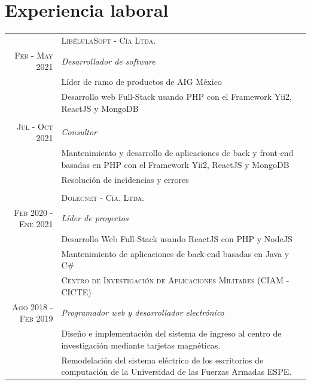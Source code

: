 \documentclass[a4paper,10.9pt]{article}
\begin{document}
\section{Experiencia laboral}
\begin{tabular}{r|p{11cm}}
&\textsc{LibélulaSoft - Cía Ltda.} \\
\textsc{Feb - May 2021} &\emph{Desarrollador de software}\\
&\footnotesize{Líder de ramo de productos de AIG México}\\
&\footnotesize{Desarrollo web Full-Stack usando PHP con el Framework Yii2, ReactJS y MongoDB}\\
\\
\textsc{Jul - Oct 2021} &\emph{Consultor}\\
&\footnotesize{Mantenimiento y desarrollo de aplicaciones de back y front-end basadas en PHP con el Framework Yii2, ReactJS y MongoDB}\\
&\footnotesize{Resolución de incidencias y errores}\\
\multicolumn{2}{c}{} \\ 
&\textsc{Dolecnet - Cía. Ltda.}\\
\textsc{Feb 2020 - Ene 2021} &\emph{Líder de proyectos}\\
&\footnotesize{Desarrollo Web Full-Stack usando ReactJS con PHP y NodeJS}\\
&\footnotesize{Mantenimiento de aplicaciones de back-end basadas en Java y C\#}
\multicolumn{2}{c}{} \\ 
&\textsc{Centro de Investigación de Aplicaciones Militares (CIAM - CICTE)}\\
\textsc{Ago 2018 - Feb 2019}&\emph{Programador web y desarrollador electrónico}\\
&\footnotesize{Diseño e implementación del sistema de ingreso al centro de investigación mediante tarjetas magnéticas.}\\
&\footnotesize{Remodelación del sistema eléctrico de los escritorios de computación de la Universidad de las Fuerzas Armadas ESPE.}\\  
\end{tabular}
\end{document}
